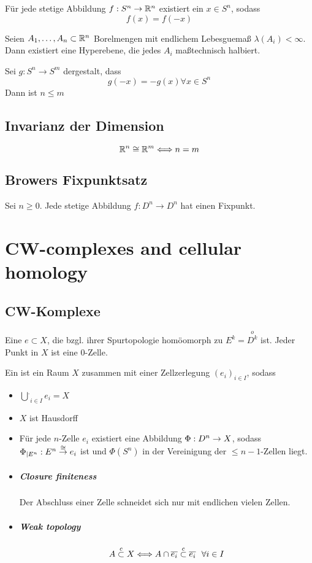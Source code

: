 Für jede stetige Abbildung $f : S^n \overset{}{\rightarrow} \mathbb{R}^n$ existiert ein $x \in S^n$, sodass
\[f(x) = f(-x) \]

Seien $A_1, \ldots, A_n \subset \mathbb{R}^n$ Borelmengen mit endlichem Lebesguemaß $\lambda(A_i) < \infty$. Dann existiert eine Hyperebene, die jedes $A_i$ maßtechnisch halbiert.

Sei $g : S^n \rightarrow S^m$ dergestalt, dass
\[g(-x) = -g(x) \forall x \in S^n\]
Dann ist $n \leq m$

\section{Invarianz der Dimension}
\Satz{}
\[\mathbb{R}^n \cong \mathbb{R}^m \Longleftrightarrow n = m \]

\section{Browers Fixpunktsatz}
\Satz{}
Sei $n\geq0$. Jede stetige Abbildung $f : D^n \rightarrow D^n$ hat einen Fixpunkt.


\chapter{CW-complexes and cellular homology}

\section{CW-Komplexe}
\Def{}
Eine  $e \subset X$, die bzgl. ihrer Spurtopologie homöomorph zu $E^k= \overset{o}{D^k}$ ist. Jeder Punkt in $X$ ist eine 0-Zelle.

\Def{}
Ein  ist ein Raum $X$ zusammen mit einer Zellzerlegung $(e_i)_{i\in I}$, sodass
\begin{itemize}
\item $\overset{.}{\bigcup}_{i\in I}e_i = X$
\item $X$ ist Hausdorff
\item Für jede $n$-Zelle $e_i$ existiert eine Abbildung $\Phi : D^n \overset{}{\rightarrow} X$, sodass $\Phi_{|E^n} : E^n \overset{\cong}{\rightarrow} e_i$ ist und  $\Phi(S^n)$ in der Vereinigung der $\leq n -1$-Zellen liegt.
\item \paragraph{Closure finiteness} Der Abschluss einer Zelle schneidet sich nur mit endlichen vielen Zellen.
\item \paragraph{Weak topology} 
\[A \overset{c}{\subset} X \Longleftrightarrow A\cap \overline{e_i} \overset{c}{\subset} \overline{e_i} ~~\forall i \in I  \]
\end{itemize}

